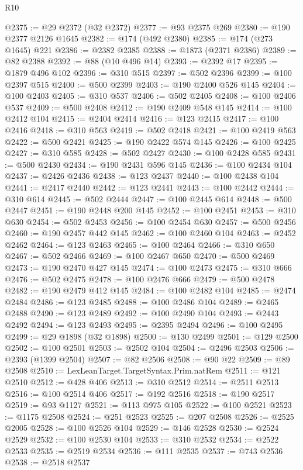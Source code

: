 \begin{lexlean}{R10}
\begin{coremodule}
@2375 := @29 @2372 (@32 @2372)
@2377 := @93 @2375 @269
@2380 := @190 @2377 @2126 @1645
@2382 := @174 (@492 @2380)
@2385 := @174 (@273 @1645) @221
@2386 := @2382 @2385
@2388 := @1873 (@2371 @2386)
@2389 := @82 @2388
@2392 := @88 (@10 @496 @14)
@2393 := @2392 @17
@2395 := @1879 @496 @102
@2396 := @310 @515
@2397 := @502 @2396
@2399 := @100 @2397 @515
@2400 := @500 @2399
@2403 := @190 @2400 @526 @145
@2404 := @100 @2403
@2405 := @310 @537
@2406 := @502 @2405
@2408 := @100 @2406 @537
@2409 := @500 @2408
@2412 := @190 @2409 @548 @145
@2414 := @100 @2412 @104
@2415 := @2404 @2414
@2416 := @123 @2415
@2417 := @100 @2416
@2418 := @310 @563
@2419 := @502 @2418
@2421 := @100 @2419 @563
@2422 := @500 @2421
@2425 := @190 @2422 @574 @145
@2426 := @100 @2425
@2427 := @310 @585
@2428 := @502 @2427
@2430 := @100 @2428 @585
@2431 := @500 @2430
@2434 := @190 @2431 @596 @145
@2436 := @100 @2434 @104
@2437 := @2426 @2436
@2438 := @123 @2437
@2440 := @100 @2438 @104
@2441 := @2417 @2440
@2442 := @123 @2441
@2443 := @100 @2442
@2444 := @310 @614
@2445 := @502 @2444
@2447 := @100 @2445 @614
@2448 := @500 @2447
@2451 := @190 @2448 @200 @145
@2452 := @100 @2451
@2453 := @310 @630
@2454 := @502 @2453
@2456 := @100 @2454 @630
@2457 := @500 @2456
@2460 := @190 @2457 @442 @145
@2462 := @100 @2460 @104
@2463 := @2452 @2462
@2464 := @123 @2463
@2465 := @100 @2464
@2466 := @310 @650
@2467 := @502 @2466
@2469 := @100 @2467 @650
@2470 := @500 @2469
@2473 := @190 @2470 @427 @145
@2474 := @100 @2473
@2475 := @310 @666
@2476 := @502 @2475
@2478 := @100 @2476 @666
@2479 := @500 @2478
@2482 := @190 @2479 @412 @145
@2484 := @100 @2482 @104
@2485 := @2474 @2484
@2486 := @123 @2485
@2488 := @100 @2486 @104
@2489 := @2465 @2488
@2490 := @123 @2489
@2492 := @100 @2490 @104
@2493 := @2443 @2492
@2494 := @123 @2493
@2495 := @2395 @2494
@2496 := @100 @2495
@2499 := @29 @1898 (@32 @1898)
@2500 := @130 @2499
@2501 := @129 @2500
@2502 := @100 @2501
@2503 := @2502 @104
@2504 := @2496 @2503
@2506 := @2393 (@1399 @2504)
@2507 := @82 @2506
@2508 := @90 @22
@2509 := @89 @2508
@2510 := LexLeanTarget.TargetSyntax.Prim.natRem
@2511 := @121 @2510
@2512 := @428 @406
@2513 := @310 @2512
@2514 := @2511 @2513
@2516 := @100 @2514 @406
@2517 := @192 @2516
@2518 := @190 @2517
@2519 := @93 @1127
@2521 := @113 @975 @105
@2522 := @100 @2521
@2523 := @1175 @2508
@2524 := @251 @2523
@2525 := @207 @2508
@2526 := @2525 @2005
@2528 := @100 @2526 @104
@2529 := @146 @2528
@2530 := @2524 @2529
@2532 := @100 @2530 @104
@2533 := @310 @2532
@2534 := @2522 @2533
@2535 := @2519 @2534
@2536 := @111 @2535
@2537 := @743 @2536
@2538 := @2518 @2537

\end{coremodule}
\end{lexlean}

